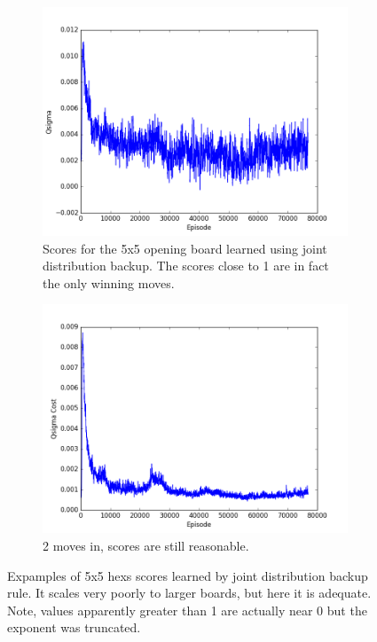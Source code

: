 \documentclass{article}
\begin{document}
\begin{figure}[!ht]
\begin{subfigure}[t]{.45\textwidth}
  \centering
      \includegraphics[width=1\textwidth]{pics/5x5_exp_Qsigma.png}
  \caption{Scores for the 5x5 opening board learned using joint distribution backup. The scores close to 1 are in fact the only winning moves.}
  \label{fig:5x5_1}
\end{subfigure}\hfill
\begin{subfigure}[t]{.45\textwidth}
  \centering
      \includegraphics[width=1\textwidth]{pics/5x5_exp_Qsigma_cost.png}
  \caption{2 moves in, scores are still reasonable.}
  \label{fig:5x5_2}
\end{subfigure}
\caption{Expamples of 5x5 hexs scores learned by joint distribution backup rule. It scales very poorly to larger boards, but here it is adequate. Note, values  apparently greater than 1 are actually near 0 but the exponent was truncated.}
\label{fig:5x5}
\end{figure}
\end{document}
